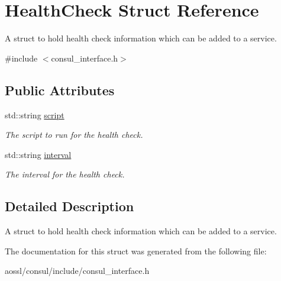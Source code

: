 \hypertarget{structHealthCheck}{}\section{Health\+Check Struct Reference}
\label{structHealthCheck}


A struct to hold health check information which can be added to a service.  




{\ttfamily \#include $<$consul\+\_\+interface.\+h$>$}

\subsection*{Public Attributes}
\begin{DoxyCompactItemize}
\item 
std\+::string \hyperlink{structHealthCheck_af2cf9613abcc567941f8a21cd8c15bff}{script}\hypertarget{structHealthCheck_af2cf9613abcc567941f8a21cd8c15bff}{}\label{structHealthCheck_af2cf9613abcc567941f8a21cd8c15bff}

\begin{DoxyCompactList}\small\item\em The script to run for the health check. \end{DoxyCompactList}\item 
std\+::string \hyperlink{structHealthCheck_af8e93405495e1733ba69a7e3f73a139a}{interval}\hypertarget{structHealthCheck_af8e93405495e1733ba69a7e3f73a139a}{}\label{structHealthCheck_af8e93405495e1733ba69a7e3f73a139a}

\begin{DoxyCompactList}\small\item\em The interval for the health check. \end{DoxyCompactList}\end{DoxyCompactItemize}


\subsection{Detailed Description}
A struct to hold health check information which can be added to a service. 

The documentation for this struct was generated from the following file\+:\begin{DoxyCompactItemize}
\item 
aossl/consul/include/consul\+\_\+interface.\+h\end{DoxyCompactItemize}
